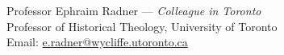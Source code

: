 \documentclass[11pt]{article}
\begin{document}
Professor Ephraim Radner --- \emph{Colleague in Toronto}\\
Professor of Historical Theology, University of Toronto\\
Email: \href{mailto:e.radner@wycliffe.utoronto.ca}{e.radner@wycliffe.utoronto.ca}\\




\end{document}
